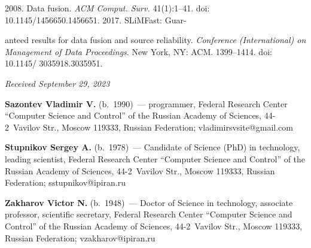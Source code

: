\begin{multicols}{2}
{{\begin{thebibliography}{9}
 2008. Data fusion. \textit{ACM Comput. 
Surv.} 41(1):1--41. doi: 10.1145/1456650.1456651.
 2017. SLiMFast: Guar-\linebreak

\columnbreak

\noindent
anteed results for data fusion and source reliability. 
\textit{Conference (International) on Management of Data Proceedings}. 
New York, NY: ACM. 1399--1414. doi: 10.1145/ 3035918.3035951.

\end{thebibliography}

 }
 }

\end{multicols}

\vspace*{-6pt}

\hfill{\small\textit{Received September 29, 2023}} 


\Contr

\vspace*{-4pt}

\noindent
\textbf{Sazontev Vladimir V.} (b.\ 1990)~--- programmer, Federal Research Center 
``Computer Science and Control'' of the Russian Academy of Sciences,  
44-2~Vavilov Str., Moscow 119333, Russian Federation; \mbox{vladimirsvsite@gmail.com}
    
\vspace*{3pt}
    
\noindent
    \textbf{Stupnikov Sergey A.} (b.\ 1978)~--- Candidate of Science (PhD) in 
technology, leading scientist, Federal Research Center ``Computer Science and 
Control'' of the Russian Academy of Sciences, 44-2~Vavilov Str., Moscow 
119333, Russian Federation; \mbox{sstupnikov@ipiran.ru}
    
\vspace*{3pt}

\noindent
    \textbf{Zakharov Victor N.} (b.\ 1948)~--- Doctor of Science in technology, 
associate professor, scientific secretary, Federal Research Center ``Computer 
Science and Control'' of the Russian Academy of Sciences, 44-2~Vavilov Str., 
Moscow 119333, Russian Federation; \mbox{vzakharov@ipiran.ru}





\label{end\stat}

\renewcommand{\bibname}{\protect\rm Литература} 